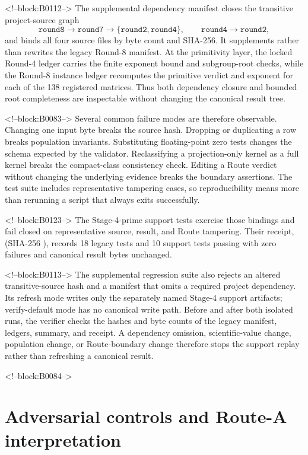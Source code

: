 \documentclass[11pt]{article}
\theoremstyle{definition}
\theoremstyle{remark}
\begin{document}
<!--block:B0112-->
The supplemental dependency manifest closes the transitive project-source graph
\[
\texttt{round8}\longrightarrow\texttt{round7}
\longrightarrow\{\texttt{round2},\texttt{round4}\},
\qquad
\texttt{round4}\longrightarrow\texttt{round2},
\]
and binds all four source files by byte count and SHA-256. It supplements rather than rewrites the legacy Round-8 manifest. At the primitivity layer, the locked Round-4 ledger carries the finite exponent bound and subgroup-root checks, while the Round-8 instance ledger recomputes the primitive verdict and exponent for each of the 138 registered matrices. Thus both dependency closure and bounded root completeness are inspectable without changing the canonical result tree.

<!--block:B0083-->
Several common failure modes are therefore observable. Changing one input byte breaks the source hash. Dropping or duplicating a row breaks population invariants. Substituting floating-point zero tests changes the schema expected by the validator. Reclassifying a projection-only kernel as a full kernel breaks the compact-class consistency check. Editing a Route verdict without changing the underlying evidence breaks the boundary assertions. The test suite includes representative tampering cases, so reproducibility means more than rerunning a script that always exits successfully.

<!--block:B0123-->
The Stage-4-prime support tests exercise those bindings and fail closed on representative source, result, and Route tampering. Their receipt,  (SHA-256 ), records 18 legacy tests and 10 support tests passing with zero failures and canonical result bytes unchanged.

<!--block:B0113-->
The supplemental regression suite also rejects an altered transitive-source hash and a manifest that omits a required project dependency. Its refresh mode writes only the separately named Stage-4 support artifacts; verify-default mode has no canonical write path. Before and after both isolated runs, the verifier checks the hashes and byte counts of the legacy manifest, ledgers, summary, and receipt. A dependency omission, scientific-value change, population change, or Route-boundary change therefore stops the support replay rather than refreshing a canonical result.

<!--block:B0084-->
\section{Adversarial controls and Route-A interpretation}
\end{document}
